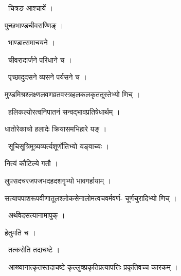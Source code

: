 \documentclass[10pt, openany, oneside]{book}
\begin{document}
\par\noindent\hspace{1.5em}{\vps वा॰}~{\qt चित्रङ आश्चार्ये ।}

\noindent पुच्छभाण्डचीवराण्णिङ् ।

\par\noindent\hspace{1.5em}{\vps वा॰}~{\qt भाण्डात्समाचयने ।}

\par\noindent\hspace{1.5em}{\vps वा॰}~{\qt चीवरादार्जने परिधाने च ।}

\par\noindent\hspace{1.5em}{\vps वा॰}~{\qt पृच्छादुदसने व्यसने पर्यसने च ।}

\noindent मुण्डमिश्रश्लक्ष्णलवणव्रतवस्त्रहलकलकृततूस्तेभ्यो णिच् ।

\par\noindent\hspace{1.5em}{\vps वा॰}~{\qt हलिकल्योरत्वनिपातनं सन्वद्भावप्रतिषेधार्थम् ।}

\noindent धातोरेकाचो हलादेः क्रियासमभिहारे यङ् ।

\par\noindent\hspace{1.5em}{\vps वा॰}~{\qt सूचिसूत्रिमूत्र्यव्यर्त्यशूर्णोतिभ्यो यङ्वाच्यः ।}

\noindent नित्यं कौटिल्ये गतौ ।

\noindent लुपसदचरजपजभदहदशगॄभ्यो भावगर्हायाम् ।

\noindent सत्यापपाशरूपवीणातूलश्लोकसेनालोमत्वचवर्मवर्ण- चूर्णचुरादिभ्यो णिच् ।

\par\noindent\hspace{1.5em}{\vps वा॰}~{\qt अर्थवेदसत्यानामापुक् ।}

\noindent हेतुमति च ।

\par\noindent\hspace{1.5em}{\vps वा॰}~{\qt तत्करोति तदाचष्टे ।}

\par\noindent\hspace{1.5em}{\vps वा॰}~{\qt आख्यानात्कृतस्तदाचष्टे कृल्लुक्प्रकृतिप्रत्यापत्तिः प्रकृतिवच्च कारकम् ।}
\end{document}
